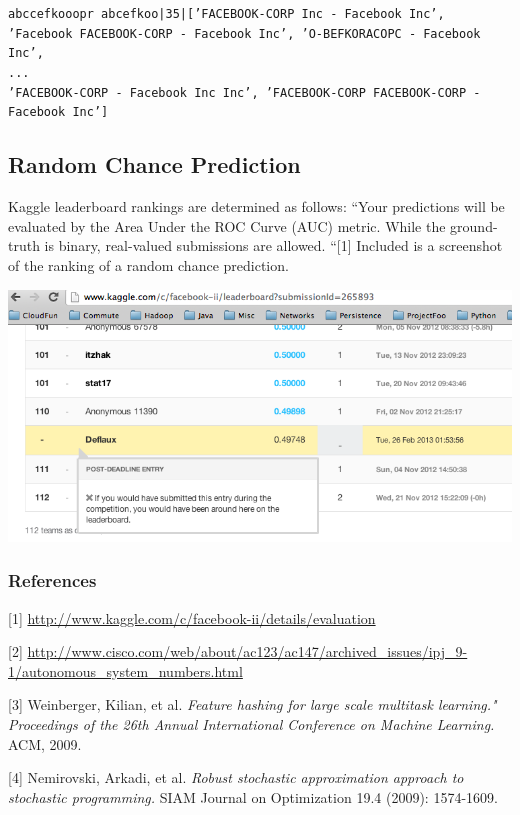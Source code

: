 \documentclass{article} %
\begin{document}
{\small \texttt{abccefkooopr abcefkoo|35|['FACEBOOK-CORP Inc - Facebook
    Inc', 'Facebook FACEBOOK-CORP - Facebook Inc', 'O-BEFKORACOPC - Facebook
    Inc', \\
... \\'FACEBOOK-CORP - Facebook Inc Inc', 'FACEBOOK-CORP FACEBOOK-CORP - Facebook Inc']}}

\subsection{Random Chance Prediction}

Kaggle leaderboard rankings are determined as follows: ``Your predictions
will be evaluated by the Area Under the ROC Curve (AUC) metric.  While the
ground-truth is binary, real-valued submissions are allowed. ``[1]  Included
is a screenshot of the ranking of a random chance prediction.

  \begin{center}
    \includegraphics[scale=.4]{randomPredictions.png}
  \end{center}

\subsubsection*{References}

\small{
[1] \url{http://www.kaggle.com/c/facebook-ii/details/evaluation}

[2] \url{http://www.cisco.com/web/about/ac123/ac147/archived_issues/ipj_9-1/autonomous_system_numbers.html}

[3]  Weinberger, Kilian, et al. {\it Feature hashing for large scale multitask learning." Proceedings of the 26th Annual International Conference on Machine Learning.} ACM, 2009.

[4] Nemirovski, Arkadi, et al. {\it Robust stochastic approximation approach to stochastic programming.} SIAM Journal on Optimization 19.4 (2009): 1574-1609.
}
\end{document}

